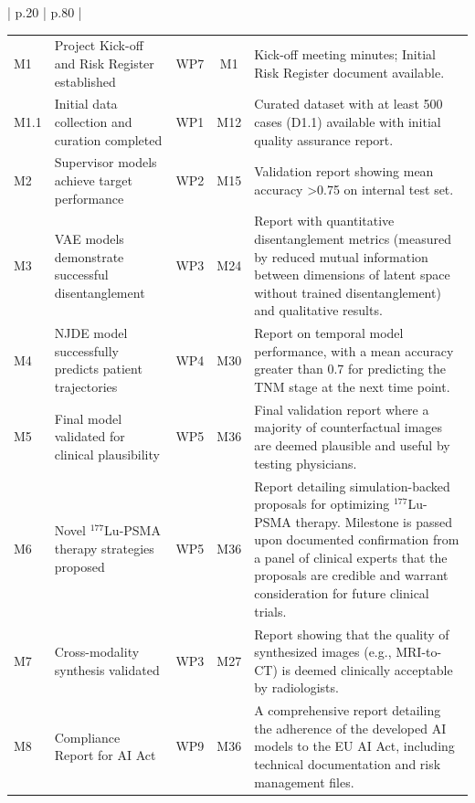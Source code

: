 \documentclass[11pt, a4paper]{article}
\begin{document}
\begin{longtable}{| p{} | p{} |}
\begin{longtable}{@{} lp{5.0cm} l c p{6.5cm} @{}}
    M1 & Project Kick-off and Risk Register established & WP7 & M1 & Kick-off meeting minutes; Initial Risk Register document available. \\
    M1.1 & Initial data collection and curation completed & WP1 & M12 & Curated dataset with at least 500 cases (D1.1) available with initial quality assurance report. \\
    M2 & Supervisor models achieve target performance & WP2 & M15 & Validation report showing mean accuracy >0.75 on internal test set. \\
    M3 & VAE models demonstrate successful disentanglement & WP3 & M24 & Report with quantitative disentanglement metrics (measured by reduced mutual information between dimensions of latent space without trained disentanglement) and qualitative results. \\
    M4 & NJDE model successfully predicts patient trajectories & WP4 & M30 & Report on temporal model performance, with a mean accuracy greater than 0.7 for predicting the TNM stage at the next time point. \\
    M5 & Final model validated for clinical plausibility & WP5 & M36 & Final validation report where a majority of counterfactual images are deemed plausible and useful by testing physicians. \\
    M6 & Novel $^{177}$Lu-PSMA therapy strategies proposed & WP5 & M36 & Report detailing simulation-backed proposals for optimizing $^{177}$Lu-PSMA therapy. Milestone is passed upon documented confirmation from a panel of clinical experts that the proposals are credible and warrant consideration for future clinical trials. \\
    M7 & Cross-modality synthesis validated & WP3 & M27 & Report showing that the quality of synthesized images (e.g., MRI-to-CT) is deemed clinically acceptable by radiologists. \\
    M8 & Compliance Report for AI Act & WP9 & M36 & A comprehensive report detailing the adherence of the developed AI models to the EU AI Act, including technical documentation and risk management files. \\
    
\end{longtable}
\endgroup %


\end{longtable}
\end{document}

